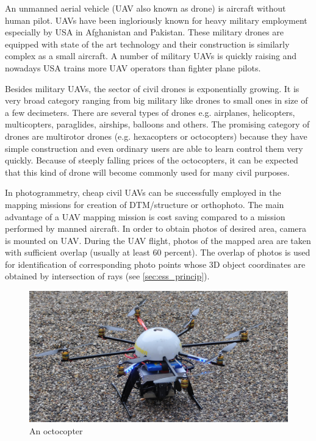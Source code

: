 \documentclass[a4paper,12pt]{article}
\begin{document}
An unmanned aerial vehicle (UAV also known as drone) is aircraft without human pilot.  UAVs have been ingloriously known for
 heavy military employment especially by USA in Afghanistan and Pakistan. These military drones are equipped with state of the art 
technology and their construction is similarly complex as a small aircraft.  
A number of military UAVs is quickly raising and nowadays USA trains more UAV operators than fighter plane pilots.


Besides military UAVs, the sector of civil drones is exponentially growing. It is very broad category ranging
from big military like drones to small ones in size of a few decimeters. There are several types of drones e.g. airplanes,
helicopters, multicopters, paraglides, airships, balloons and others. 
The promising category of drones are multirotor drones (e.g. hexacopters or octocopters) because they have simple construction and 
even ordinary users are able to learn control them very quickly. Because of steeply falling prices of the octocopters, it can be expected 
that this kind of drone will become commonly used for many civil purposes.

In photogrammetry, cheap civil UAVs can be successfully employed in the mapping missions for creation of DTM/structure or orthophoto.
The main advantage of a UAV mapping mission is cost saving compared to a mission performed by manned aircraft.
In order to obtain photos of desired area, camera is mounted on UAV. During the UAV flight, photos of the mapped 
area are taken with sufficient overlap (usually at least 60 percent). The overlap of photos is used for identification 
of corresponding photo points whose 3D object coordinates are obtained by intersection of rays (see \ref{sec:ess_princip}). 

\begin{figure}[h]
    \centering
    \includegraphics[scale=0.8]{figures/octocopter.jpg}
    \caption{An octocopter \cite{boe2013octocopter}}
    \label{fig:sample_figure}
\end{figure}
\end{document}
